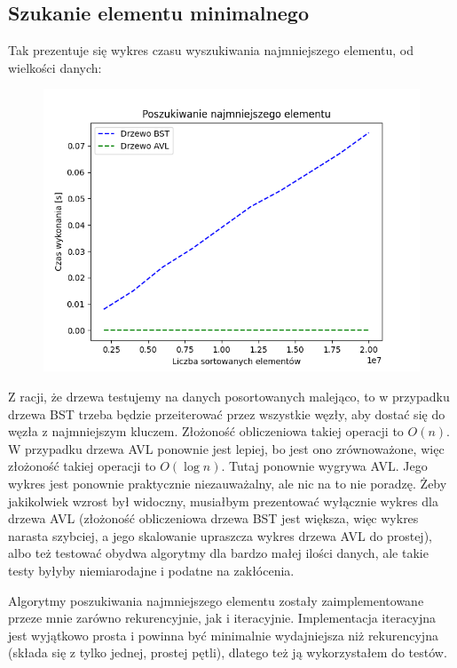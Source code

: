 \documentclass[12pt]{article}
\begin{document}
        \subsection{Szukanie elementu minimalnego}
        Tak prezentuje się wykres czasu wyszukiwania najmniejszego elementu, od wielkości danych:
        \begin{figure}[h]
            \centering
            \includegraphics[width=\textwidth]{wykresy/Poszukiwanie_najmniejszego_elementu.png}
        \end{figure}
        
        Z racji, że drzewa testujemy na danych posortowanych malejąco, to w przypadku drzewa BST trzeba będzie przeiterować przez wszystkie węzły, aby dostać się do węzła z najmniejszym kluczem. Złożoność obliczeniowa takiej operacji to $O(n)$. W przypadku drzewa AVL ponownie jest lepiej, bo jest ono zrównoważone, więc złożoność takiej operacji to $O(\log{n})$. Tutaj ponownie wygrywa AVL. Jego wykres jest ponownie praktycznie niezauważalny, ale nic na to nie poradzę. Żeby jakikolwiek wzrost był widoczny, musiałbym prezentować wyłącznie wykres dla drzewa AVL (złożoność obliczeniowa drzewa BST jest większa, więc wykres narasta szybciej, a jego skalowanie upraszcza wykres drzewa AVL do prostej), albo też testować obydwa algorytmy dla bardzo małej ilości danych, ale takie testy byłyby niemiarodajne i podatne na zakłócenia.
        
        Algorytmy poszukiwania najmniejszego elementu zostały zaimplementowane przeze mnie zarówno rekurencyjnie, jak i iteracyjnie. Implementacja iteracyjna jest wyjątkowo prosta i powinna być minimalnie wydajniejsza niż rekurencyjna (składa się z tylko jednej, prostej pętli), dlatego też ją wykorzystałem do testów.
        \newpage
        
\end{document}
